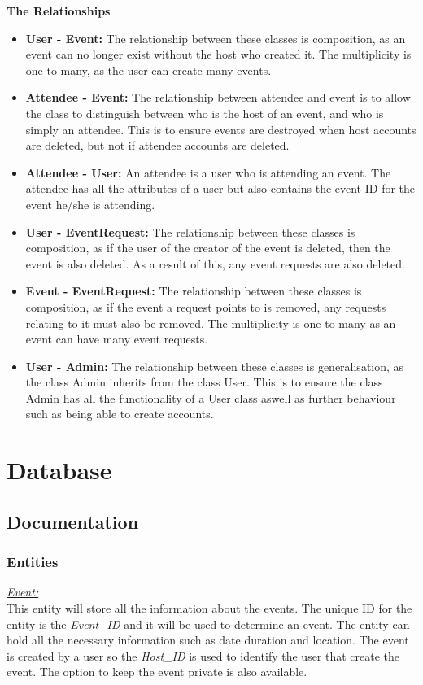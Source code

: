 \documentclass[a4paper]{article}
\begin{document}
\textbf{The Relationships}
\begin{itemize}
    \item \textbf{User - Event:} The relationship between these classes is composition, as an event can no longer exist without the host who created it. The multiplicity is one-to-many, as the user can create many events.
    \item \textbf{Attendee - Event:} The relationship between attendee and event is to allow the class to distinguish between who is the host of an event, and who is simply an attendee. This is to ensure events are destroyed when host accounts are deleted, but not if attendee accounts are deleted.
    \item \textbf{Attendee - User:} An attendee is a user who is attending an event. The attendee has all the attributes of a user but also contains the event ID for the event he/she is attending.
    \item \textbf{User - EventRequest:} The relationship between these classes is composition, as if the user of the creator of the event is deleted, then the event is also deleted. As a result of this, any event requests are also deleted.
    \item \textbf{Event - EventRequest:} The relationship between these classes is composition, as if the event a request points to is removed, any requests relating to it must also be removed. The multiplicity is one-to-many as an event can have many event requests.
    \item \textbf{User - Admin:} The relationship between these classes is generalisation, as the class Admin inherits from the class User. This is to ensure the class Admin has all the functionality of a User class aswell as further behaviour such as being able to create accounts.
\end{itemize}
\section{Database}
\subsection{Documentation}
\subsubsection{Entities}
\underline{\textit{Event:}} \\
This entity will store all the information about the events. The unique ID for the entity is the \textit{Event\_ID} and it will be used to determine an event. The entity can hold all the necessary information such as date duration and location. The event is created by a user so the \textit{Host\_ID} is used to identify the user that create the event. The option to keep the event private is also available. 
\end{document}
